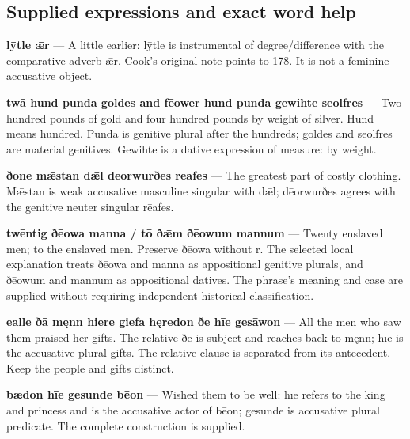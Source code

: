 \subsection*{Supplied expressions and exact word help}

\textbf{lȳtle ǣr} — A little earlier: lȳtle is instrumental of degree/\allowbreak{}difference with the comparative adverb ǣr. Cook’s original note points to 178. It is not a feminine accusative object.

\textbf{twā hund punda goldes and fēower hund punda gewihte seolfres} — Two hundred pounds of gold and four hundred pounds by weight of silver. Hund means hundred. Punda is genitive plural after the hundreds; goldes and seolfres are material genitives. Gewihte is a dative expression of measure: by weight.

\textbf{ðone mǣstan dǣl dēorwurðes rēafes} — The greatest part of costly clothing. Mǣstan is weak accusative masculine singular with dǣl; dēorwurðes agrees with the genitive neuter singular rēafes.

\textbf{twēntig ðēowa manna /\allowbreak{} tō ðǣm ðēowum mannum} — Twenty enslaved men; to the enslaved men. Preserve ðēowa without r. The selected local explanation treats ðēowa and manna as appositional genitive plurals, and ðēowum and mannum as appositional datives. The phrase’s meaning and case are supplied without requiring independent historical classification.

\textbf{ealle ðā męnn hiere giefa hęredon ðe hīe gesāwon} — All the men who saw them praised her gifts. The relative ðe is subject and reaches back to męnn; hīe is the accusative plural gifts. The relative clause is separated from its antecedent. Keep the people and gifts distinct.

\textbf{bǣdon hīe gesunde bēon} — Wished them to be well: hīe refers to the king and princess and is the accusative actor of bēon; gesunde is accusative plural predicate. The complete construction is supplied.

